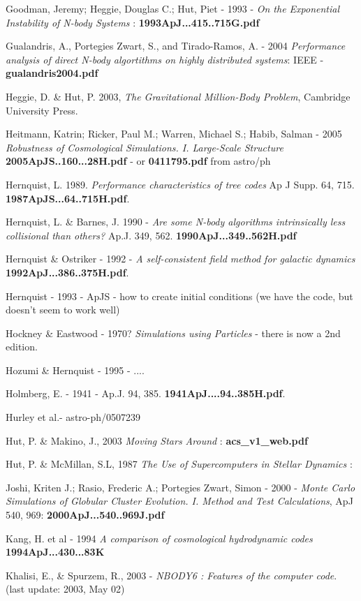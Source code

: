 \begin{itemize}
\begin{itemize}
Goodman, Jeremy; Heggie, Douglas C.; Hut, Piet - 1993 -
{\it On the Exponential Instability of N-body Systems} :
{\bf 1993ApJ...415..715G.pdf}

Gualandris, A., Portegies Zwart, S., and Tirado-Ramos, A. - 2004
{\it Performance analysis of direct N-body algortithms on highly distributed systems}:
IEEE - {\bf gualandris2004.pdf}

Heggie, D. \& Hut, P. 2003, 
{\it The Gravitational Million-Body Problem}, 
Cambridge University Press.

Heitmann, Katrin; Ricker, Paul M.; Warren, Michael S.; Habib, Salman - 2005
{\it Robustness of Cosmological Simulations. I. Large-Scale Structure}
{\bf 2005ApJS..160...28H.pdf} - or {\bf 0411795.pdf} from astro/ph

Hernquist, L. 1989. {\it Performance characteristics of tree codes} Ap J Supp. 64, 715.
{\bf 1987ApJS...64..715H.pdf}.

Hernquist, L. \& Barnes, J. 1990 - 
{\it Are some N-body algorithms intrinsically less collisional than others?}
Ap.J. 349,  562. {\bf 1990ApJ...349..562H.pdf}

Hernquist \& Ostriker - 1992 - {\it A self-consistent field method for galactic dynamics}
{\bf 1992ApJ...386..375H.pdf}.

Hernquist - 1993 - ApJS - how to create initial conditions (we have the code, but doesn't
seem to work well)

Hockney \& Eastwood - 1970? {\it Simulations using Particles} - there is now a 2nd edition.

Hozumi \& Hernquist - 1995 - ....

Holmberg, E. - 1941 - Ap.J. 94, 385.
{\bf 1941ApJ....94..385H.pdf}.

Hurley et al.- astro-ph/0507239

Hut, P. \& Makino, J., 2003  {\it Moving Stars Around} :
{\bf acs\_v1\_web.pdf}

Hut, P. \& McMillan, S.L, 1987  {\it The Use of Supercomputers in Stellar Dynamics} :

Joshi, Kriten J.; Rasio, Frederic A.; Portegies Zwart, Simon - 2000 -
{\it Monte Carlo Simulations of Globular Cluster Evolution. I. Method and Test Calculations},
ApJ 540, 969: 
{\bf 2000ApJ...540..969J.pdf}

Kang, H. et al - 1994
{\it A comparison of cosmological hydrodynamic codes}
{\bf 1994ApJ...430...83K}

Khalisi, E., \& Spurzem, R., 2003 - {\it NBODY6 : Features of the computer code}.
(last update: 2003, May 02)


\end{itemize}
\end{itemize}
